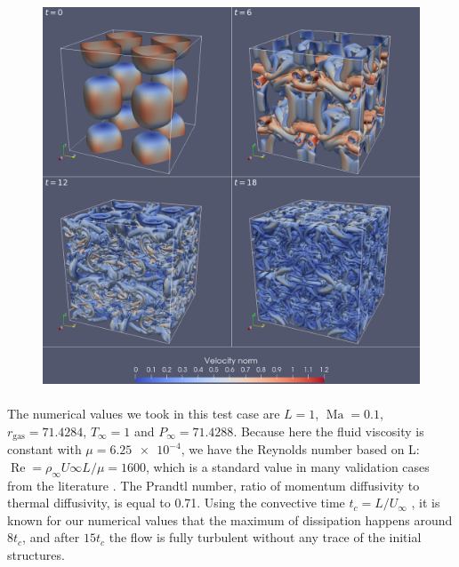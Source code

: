       \begin{figure}
        \centering
        \includegraphics[width=\textwidth]{figures/tgv_fields.png}
        \caption{}
        \label{fig:tgv_fields}
      \end{figure}

      \paragraph{}
      The numerical values we took in this test case are $L = 1$, $\operatorname{Ma} = 0.1$, $r_\textrm{gas} = 71.4284$, $T_\infty = 1$ and $P_\infty = 71.4288$.
      Because here the fluid viscosity is constant with $\mu = \num{6.25e-4}$, we have the Reynolds number based on L: $\operatorname{Re} = \rho_\infty U\infty L / \mu = 1600$, which is a standard value in many validation cases from the literature .
      The Prandtl number, ratio of momentum diffusivity to thermal diffusivity, is equal to 0.71.
      Using the convective time $t_c = L / U_\infty$ , it is known for our numerical values that the maximum of dissipation happens around $8 t_c$, and after $15 t_c$ the flow is fully turbulent without any trace of the initial structures.

